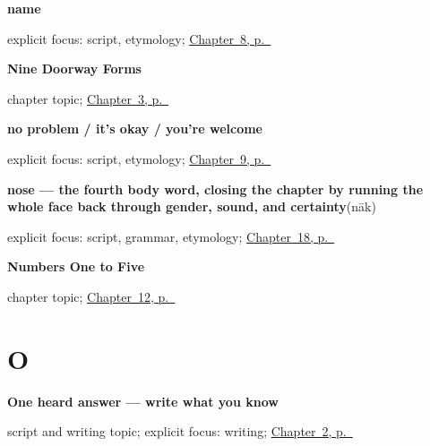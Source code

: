 \noindent\begin{minipage}[t]{\linewidth}
\raggedright
\textbf{name}\enspace\emph{}\par
\footnotesize explicit focus: script, etymology; \hyperref[ch:introductions]{Chapter~8, p.~\pageref*{ch:introductions}}
\end{minipage}\par\smallskip

\noindent\begin{minipage}[t]{\linewidth}
\raggedright
\textbf{Nine Doorway Forms}\par
\footnotesize chapter topic; \hyperref[ch:gu-doorway-forms]{Chapter~3, p.~\pageref*{ch:gu-doorway-forms}}
\end{minipage}\par\smallskip

\noindent\begin{minipage}[t]{\linewidth}
\raggedright
\textbf{no problem / it's okay / you're welcome}\enspace\emph{ }\par
\footnotesize explicit focus: script, etymology; \hyperref[ch:responding]{Chapter~9, p.~\pageref*{ch:responding}}
\end{minipage}\par\smallskip

\noindent\begin{minipage}[t]{\linewidth}
\raggedright
\textbf{nose — the fourth body word, closing the chapter by running the whole face back through gender, sound, and certainty}\enspace\emph{}\enspace(nāk)\par
\footnotesize explicit focus: script, grammar, etymology; \hyperref[ch:gu-face-parts]{Chapter~18, p.~\pageref*{ch:gu-face-parts}}
\end{minipage}\par\smallskip

\noindent\begin{minipage}[t]{\linewidth}
\raggedright
\textbf{Numbers One to Five}\par
\footnotesize chapter topic; \hyperref[ch:numbers-one-to-five]{Chapter~12, p.~\pageref*{ch:numbers-one-to-five}}
\end{minipage}\par\smallskip

\section*{O}

\noindent\begin{minipage}[t]{\linewidth}
\raggedright
\textbf{One heard answer — write what you know}\par
\footnotesize script and writing topic; explicit focus: writing; \hyperref[ch:greetings]{Chapter~2, p.~\pageref*{ch:greetings}}
\end{minipage}\par\smallskip


